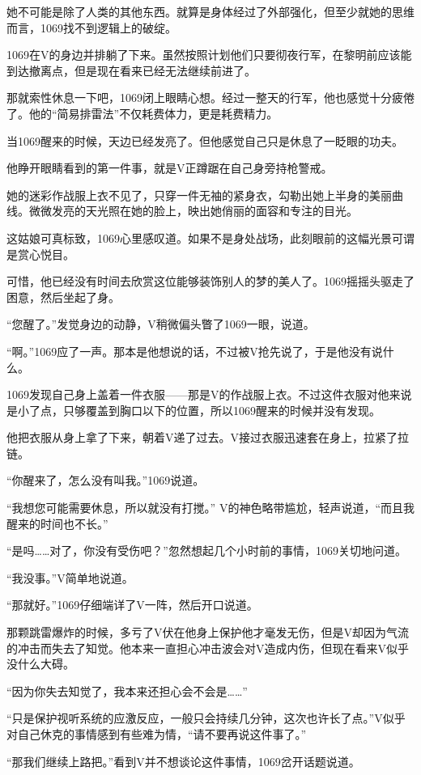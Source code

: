 她不可能是除了人类的其他东西。就算是身体经过了外部强化，但至少就她的思维而言，1069找不到逻辑上的破绽。

1069在V的身边并排躺了下来。虽然按照计划他们只要彻夜行军，在黎明前应该能到达撤离点，但是现在看来已经无法继续前进了。

那就索性休息一下吧，1069闭上眼睛心想。经过一整天的行军，他也感觉十分疲倦了。他的“简易排雷法”不仅耗费体力，更是耗费精力。

当1069醒来的时候，天边已经发亮了。但他感觉自己只是休息了一眨眼的功夫。

他睁开眼睛看到的第一件事，就是V正蹲踞在自己身旁持枪警戒。

她的迷彩作战服上衣不见了，只穿一件无袖的紧身衣，勾勒出她上半身的美丽曲线。微微发亮的天光照在她的脸上，映出她俏丽的面容和专注的目光。

这姑娘可真标致，1069心里感叹道。如果不是身处战场，此刻眼前的这幅光景可谓是赏心悦目。

可惜，他已经没有时间去欣赏这位能够装饰别人的梦的美人了。1069摇摇头驱走了困意，然后坐起了身。

“您醒了。”发觉身边的动静，V稍微偏头瞥了1069一眼，说道。

“啊。”1069应了一声。那本是他想说的话，不过被V抢先说了，于是他没有说什么。

1069发现自己身上盖着一件衣服——那是V的作战服上衣。不过这件衣服对他来说是小了点，只够覆盖到胸口以下的位置，所以1069醒来的时候并没有发现。

他把衣服从身上拿了下来，朝着V递了过去。V接过衣服迅速套在身上，拉紧了拉链。

“你醒来了，怎么没有叫我。”1069说道。

“我想您可能需要休息，所以就没有打搅。” V的神色略带尴尬，轻声说道，“而且我醒来的时间也不长。”

“是吗……对了，你没有受伤吧？”忽然想起几个小时前的事情，1069关切地问道。

“我没事。”V简单地说道。

“那就好。”1069仔细端详了V一阵，然后开口说道。

那颗跳雷爆炸的时候，多亏了V伏在他身上保护他才毫发无伤，但是V却因为气流的冲击而失去了知觉。他本来一直担心冲击波会对V造成内伤，但现在看来V似乎没什么大碍。

“因为你失去知觉了，我本来还担心会不会是……”

“只是保护视听系统的应激反应，一般只会持续几分钟，这次也许长了点。”V似乎对自己休克的事情感到有些难为情，“请不要再说这件事了。”

“那我们继续上路把。”看到V并不想谈论这件事情，1069岔开话题说道。

